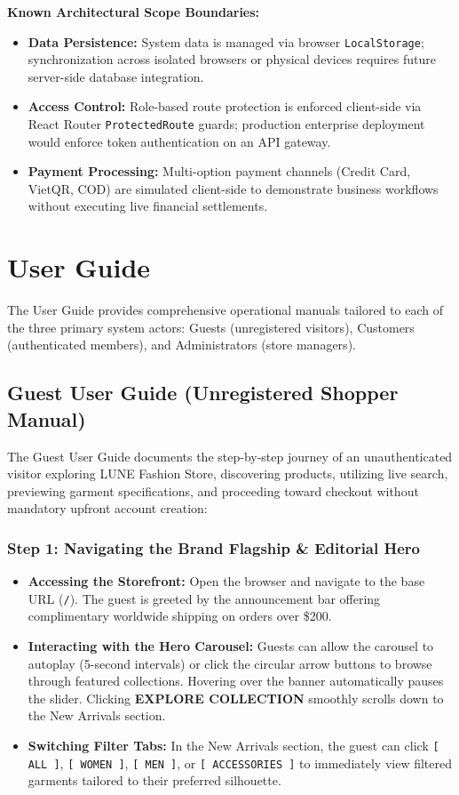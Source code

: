 \documentclass[12pt,a4paper,oneside]{report}
\begin{document}
\textbf{Known Architectural Scope Boundaries:}
\begin{itemize}[leftmargin=1.2cm]
    \item \textbf{Data Persistence:} System data is managed via browser \texttt{LocalStorage}; synchronization across isolated browsers or physical devices requires future server-side database integration.
    \item \textbf{Access Control:} Role-based route protection is enforced client-side via React Router \texttt{ProtectedRoute} guards; production enterprise deployment would enforce token authentication on an API gateway.
    \item \textbf{Payment Processing:} Multi-option payment channels (Credit Card, VietQR, COD) are simulated client-side to demonstrate business workflows without executing live financial settlements.
\end{itemize}

\section{User Guide}
The User Guide provides comprehensive operational manuals tailored to each of the three primary system actors: Guests (unregistered visitors), Customers (authenticated members), and Administrators (store managers).

\subsection{Guest User Guide (Unregistered Shopper Manual)}
The Guest User Guide documents the step-by-step journey of an unauthenticated visitor exploring LUNE Fashion Store, discovering products, utilizing live search, previewing garment specifications, and proceeding toward checkout without mandatory upfront account creation:

\subsubsection{Step 1: Navigating the Brand Flagship \& Editorial Hero}
\begin{itemize}[leftmargin=1.2cm]
    \item \textbf{Accessing the Storefront:} Open the browser and navigate to the base URL (\texttt{/}). The guest is greeted by the announcement bar offering complimentary worldwide shipping on orders over \$200.
    \item \textbf{Interacting with the Hero Carousel:} Guests can allow the carousel to autoplay (5-second intervals) or click the circular arrow buttons to browse through featured collections. Hovering over the banner automatically pauses the slider. Clicking \textbf{EXPLORE COLLECTION} smoothly scrolls down to the New Arrivals section.
    \item \textbf{Switching Filter Tabs:} In the New Arrivals section, the guest can click \texttt{[ ALL ]}, \texttt{[ WOMEN ]}, \texttt{[ MEN ]}, or \texttt{[ ACCESSORIES ]} to immediately view filtered garments tailored to their preferred silhouette.
\end{itemize}
\end{document}
